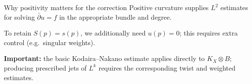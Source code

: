 \begin{frame}{Why positivity matters for the correction}
Positive curvature supplies \(L^2\) estimates for solving
\(\bar\partial u=f\) in the appropriate bundle and degree.
\par\medskip
To retain \(S(p)=s(p)\), we additionally need \(u(p)=0\);
this requires extra control (e.g.\ singular weights).
\par\medskip
\textbf{Important:} the basic Kodaira--Nakano estimate applies directly
to \(K_X\otimes B\); producing prescribed jets of \(L^k\)
requires the corresponding twist and weighted estimates.
\end{frame}


